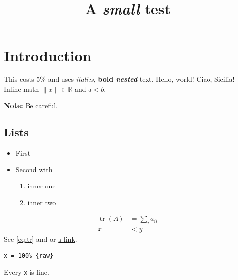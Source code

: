 \documentclass{article}
\title{A \emph{small} test}
\newcommand{\R}{\mathbb{R}}
\newcommand{\norm}[1]{\left\| #1 \right\|}
\newcommand{\greet}[2][Hello]{#1, #2!}
\DeclareMathOperator{\tr}{tr}
\newenvironment{note}{\textbf{Note:} }{}
\begin{document}
\maketitle
\section{Introduction}
This costs 5\% and uses \textit{italics}, \textbf{bold \emph{nested}} text. \greet{world} \greet[Ciao]{Sicilia}
Inline math $\norm{x} \in \R$ and \(a < b\).

\begin{note}Be careful.\end{note}

\subsection*{Lists}
\begin{itemize}
  \item First
  \item Second with
  \begin{enumerate}
    \item inner one
    \item inner two
  \end{enumerate}
\end{itemize}

\begin{align}
  \tr(A) &= \sum_i a_{ii} \label{eq:tr} \\
  x &< y
\end{align}
See \eqref{eq:tr} and \cite[p.~3]{knuth} or \href{https://example.org}{a link}.
\begin{verbatim}
x = 100% {raw}
\end{verbatim}
\begin{theorem}Every \texttt{x} is fine.\end{theorem}
\end{document}
